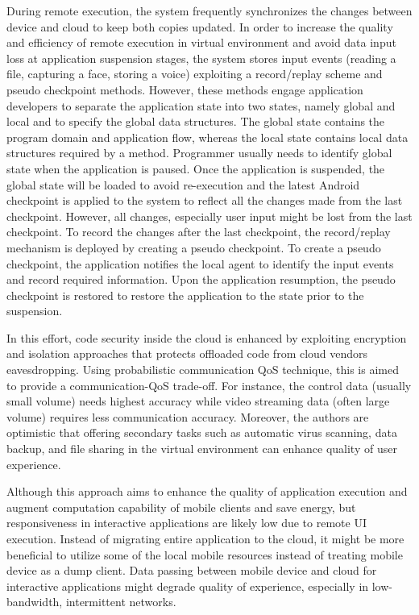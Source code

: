 \documentclass[publish]{IEEEtran}
\begin{document}
\begin{itemize}
During remote execution, the system frequently synchronizes the changes between device and cloud to keep both copies updated. In order to increase the quality and efficiency of remote execution in virtual environment and avoid data input loss at application suspension stages, the system stores input events (reading a file, capturing a face, storing a voice) exploiting a record/replay scheme and pseudo checkpoint methods. However, these methods engage application developers to separate the application state into two states, namely global and local and to specify the global data structures. The global state contains the program domain and application flow, whereas the local state contains local data structures required by a method. Programmer usually needs to identify global state when the application is paused. Once the application is suspended, the global state will be loaded to avoid re-execution and the latest Android checkpoint is applied to the system to reflect all the changes made from the last checkpoint. However, all changes, especially user input might be lost from the last checkpoint. To record the changes after the last checkpoint, the record/replay mechanism is deployed by creating a pseudo checkpoint. To create a pseudo checkpoint, the application notifies the local agent to identify the input events and record required information. Upon the application resumption, the pseudo checkpoint is restored to restore the application to the state prior to the suspension.

In this effort, code security inside the cloud is enhanced by exploiting encryption and isolation approaches that protects offloaded code from cloud vendors eavesdropping. Using probabilistic communication QoS technique,  this is aimed to provide a communication-QoS trade-off. For instance, the control data (usually small volume) needs highest accuracy while video streaming data (often large volume) requires less communication accuracy. Moreover, the authors are optimistic that offering secondary tasks such as automatic virus scanning, data backup, and file sharing in the virtual environment can enhance quality of user experience.

Although this approach aims to enhance the quality of application execution and augment computation capability of mobile clients and save energy, but responsiveness in interactive applications are likely low due to remote UI execution. Instead of migrating entire application to the cloud, it might be more beneficial to utilize some of the local mobile resources instead of treating mobile device as a dump client. Data passing between mobile device and cloud for interactive applications might degrade quality of experience, especially in low-bandwidth, intermittent networks.


\end{itemize}
\end{document}
